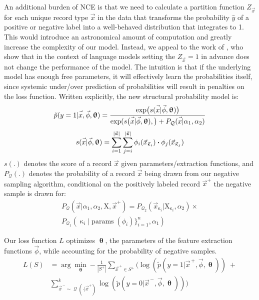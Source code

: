 \documentclass[letterpaper]{article}
\newcommand{\vect}[1]{\vec{#1}}
\DeclareMathOperator{\q}{{\mathcal{Q}}}
\newcommand{\dotp}{\boldsymbol{\cdot} }
\begin{document}
An additional burden of NCE is that we need to calculate a partition function $Z_{\vec{x}}$ for each unique record type $\vec{x}$ in the data that transforms the probability $\hat y$ of a positive or negative label into a well-behaved distribution that integrates to 1.
This would introduce an astronomical amount of computation and greatly increase the complexity of our model.
Instead, we appeal to the work of \cite{fastnnlang},
who show that in the context of language models setting the $Z_{\vec{x}}=1$ in advance does not change the performance of the model.
The intuition is that if the underlying model has enough free parameters, it will effectively learn the probabilities itself, since systemic under/over prediction of probabilities will result in penalties on the loss function.
Written explicitly, the new structural probability model is:
\begin{equation}
\tilde p(y=1|\vec{x\vphantom{phi}},\vec{\phi}, \bm\uptheta) = \frac{\exp\bigl(s(\vec{x\vphantom{phi}}|\vec{\phi}, \bm\uptheta) \bigr)}{\exp( s\bigl(\vec{x\vphantom{phi}}|\vec{\phi}, \bm\uptheta), \bigr) + P_{\q}(\vec{\vphantom{phi}x}| \alpha_1,\alpha_2)}
\end{equation}
\begin{equation}
s(\vec{x\vphantom{phi}}|\vec{\phi}, \bm\uptheta) =
                       \sum_{i =1}^{|\vect{\upkappa}|} \sum_{j=i}^{|\vect{\upkappa}|}   \phi_i( \vect{x}_{\vect{\upkappa}_i}) \dotp \phi_j( \vect{x}_{\vect{\upkappa}_j})
\end{equation}
$s(.)$ denotes the score of a record $\vec{x}$ given parameters/extraction functions,
and $P_{\q}(.)$ denotes the probability of a record $\vec{x}$ being drawn from our negative sampling algorithm, conditional on the positively labeled record $\vect{x}^+$ the negative sample is drawn for:
\begin{align*}
P_{\q}(\vec{x}|\alpha_1,\alpha_2,\mathrm{X},\vect{x}^+) = P_{\q_2}(\vec{x}_{\upkappa_i}|\mathrm{X}_{\upkappa_i},\alpha_2)\times \\ P_{\q_1}(\upkappa_i|\operatorname{params}(\phi_i)\}_{i=1}^n,\alpha_1)
\end{align*}

Our loss function $L$ optimizes $\bm\uptheta$, the parameters of the feature extraction functions $\vect\phi$, while accounting for the probability of negative samples.
\begin{align*}
L(S) & = \arg\min_{\bm\uptheta}  - \frac{1}{|S^+|} \sum_{\vect{x}^{\,+} \in S^+} \Big(\log(\tilde p(y=1|\vect{x}^{\,+},\vec{\phi},\bm\uptheta   ) ) \; + \\
&  \sum_{\vect{x}^{\,-}  \sim \q(\cdot|\vect{x}^+)}^k \log(\tilde p(y=0|\vect{x}^{\,-},\vec{\phi},\bm\uptheta   )) \Big)
\end{align*}
\end{document}
